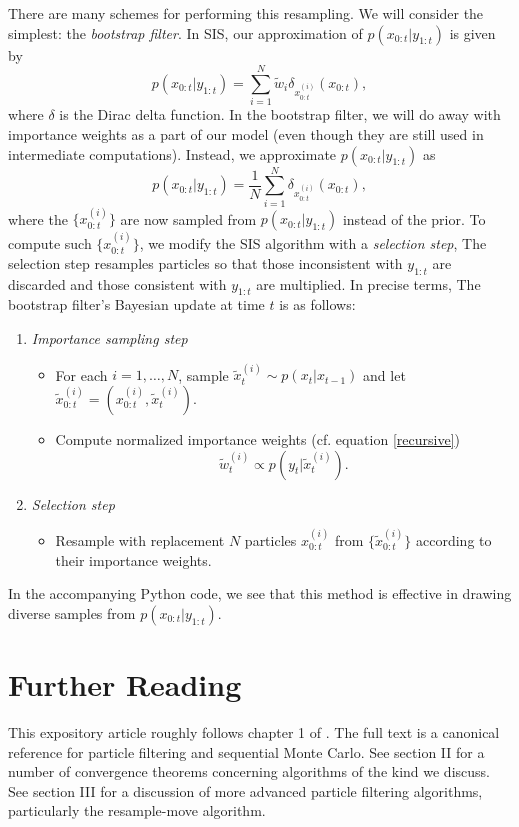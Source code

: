 \documentclass{article}
\numberwithin{equation}{section}
\begin{document}
There are many schemes for performing this resampling. We will consider the simplest: the \textit{bootstrap filter}. In
SIS, our approximation of $p(x_{0:t}|y_{1:t})$ is given by 
\[p(x_{0:t}|y_{1:t}) = \sum_{i=1}^N \tilde{w}_i\delta_{x_{0:t}^{(i)}}(x_{0:t}),\]
where $\delta$ is the Dirac delta function. In the bootstrap filter, we will do away with importance weights as a part
of our model (even though they are still used in intermediate computations). Instead, we approximate
$p(x_{0:t}|y_{1:t})$ as 
\[p(x_{0:t}|y_{1:t}) = \frac{1}{N}\sum_{i=1}^N \delta_{x_{0:t}^{(i)}}(x_{0:t}),\]
where the $\{x_{0:t}^{(i)}\}$ are now sampled from $p(x_{0:t}|y_{1:t})$ instead of the prior. To compute such
$\{x_{0:t}^{(i)}\}$, we modify the SIS algorithm with a \textit{selection step}, The selection step resamples particles so that those
inconsistent with $y_{1:t}$ are discarded and those consistent with $y_{1:t}$ are multiplied. In precise terms, The bootstrap filter's
Bayesian update at time $t$ is as follows: 
\begin{enumerate}
    \item \textit{Importance sampling step}
        \begin{itemize}
            \item For each $i = 1, \dots, N$, sample $\tilde{x}_t^{(i)} \sim p(x_t|x_{t-1})$ and let
                $\tilde{x}_{0:t}^{(i)}=(x_{0:t}^{(i)}, \tilde{x}_t^{(i)})$. 
            \item Compute normalized importance weights (cf. equation \ref{recursive})
                \[\tilde{w}_t^{(i)} \propto p(y_t|\tilde{x}_t^{(i)}). \]
        \end{itemize}
    \item \textit{Selection step}
        \begin{itemize}
            \item Resample with replacement $N$ particles $x_{0:t}^{(i)}$ from $\{\tilde{x}_{0:t}^{(i)}\}$ according to
                    their importance weights. 
        \end{itemize}
\end{enumerate}
In the accompanying Python code, we see that this method is effective in drawing diverse samples from
$p(x_{0:t}|y_{1:t})$. 

\section{Further Reading}
This expository article roughly follows chapter 1 of \cite{doucet}. The full text is a canonical reference for particle
filtering and sequential Monte Carlo. See section II for a number of convergence theorems concerning algorithms of the kind we
discuss. See section III for a discussion of more advanced particle filtering algorithms, particularly the resample-move
algorithm. 
\end{document}
